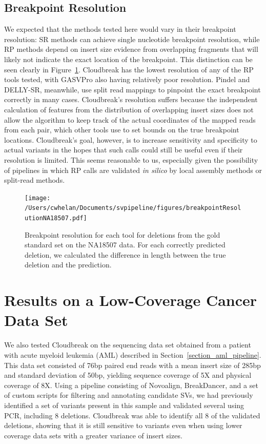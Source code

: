 \subsection{Breakpoint Resolution}

We expected that the methods tested here would vary in their breakpoint resolution: SR methods can achieve single nucleotide breakpoint resolution, while RP methods depend on insert size evidence from overlapping fragments that will likely not indicate the exact location of the breakpoint. This distinction can be seen clearly in Figure~\ref{breakpoint_resolution}. Cloudbreak has the lowest resolution of any of the RP tools tested, with GASVPro also having relatively poor resolution. Pindel and DELLY-SR, meanwhile, use split read mappings to pinpoint the exact breakpoint correctly in many cases. Cloudbreak's resolution suffers because the independent calculation of features from the distribution of overlapping insert sizes does not allow the algorithm to keep track of the actual coordinates of the mapped reads from each pair, which other tools use to set bounds on the true breakpoint locations. Cloudbreak's goal, however, is to increase sensitivity and specificity to actual variants in the hopes that such calls could still be useful even if their resolution is limited. This seems reasonable to us, especially given the possibility of pipelines in which RP calls are validated \emph{in silico} by local assembly methods or split-read methods.

\begin{figure}
\centering
\texttt{[image: /Users/cwhelan/Documents/svpipeline/figures/breakpointResolutionNA18507.pdf]}
\caption{Breakpoint resolution for each tool for deletions from the gold standard set on the NA18507 data. For each correctly predicted deletion, we calculated the difference in length between the true deletion and the prediction.}
\label{breakpoint_resolution}
\end{figure}

\section{Results on a Low-Coverage Cancer Data Set}\label{section_cloudbreak_eval_aml}

We also tested Cloudbreak on the sequencing data set obtained from a patient with acute myeloid leukemia (AML) described in Section~\ref{section_aml_pipeline}. This data set consisted of 76bp paired end reads with a mean insert size of 285bp and standard deviation of 50bp, yielding sequence coverage of 5X and physical coverage of 8X. Using a pipeline consisting of Novoalign, BreakDancer, and a set of custom scripts for filtering and annotating candidate SVs, we had previously identified a set of variants present in this sample and validated several using PCR, including 8 deletions. Cloudbreak was able to identify all 8 of the validated deletions, showing that it is still sensitive to variants even when using lower coverage data sets with a greater variance of insert sizes.

